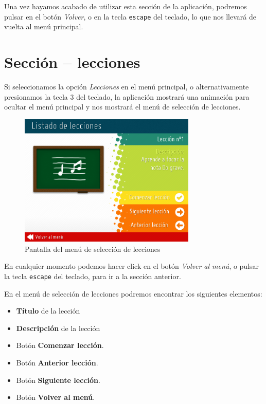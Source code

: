 Una vez hayamos acabado de utilizar esta sección de la aplicación, podremos
pulsar en el botón \textit{Volver}, o en la tecla \texttt{escape} del teclado,
lo que nos llevará de vuelta al menú principal.

\section{Sección -- lecciones}
\vspace{-0.5cm}
Si seleccionamos la opción \textit{Lecciones} en el menú principal, o
alternativamente presionamos la tecla 3 del teclado, la aplicación mostrará una
animación para ocultar el menú principal y nos mostrará el menú de selección de
lecciones. 

\begin{figure}[h!]
  \vspace{-0.2cm}
  \centering
  \includegraphics[width=0.75\textwidth]{apendice_manual_usuario/imagen_seccionLecciones1}
  \caption{Pantalla del menú de selección de lecciones}
  \vspace{-1cm}
\end{figure}

En cualquier momento podemos hacer click en el botón \textit{Volver al menú}, o
pulsar la tecla \texttt{escape} del teclado, para ir a la sección anterior.

En el menú de selección de lecciones podremos encontrar los siguientes
elementos:

\begin{itemize}
\item \textbf{Título} de la lección
\item \textbf{Descripción} de la lección
\item Botón \textbf{Comenzar lección}.
\item Botón \textbf{Anterior lección}.
\item Botón \textbf{Siguiente lección}.
\item Botón \textbf{Volver al menú}.
\end{itemize}

